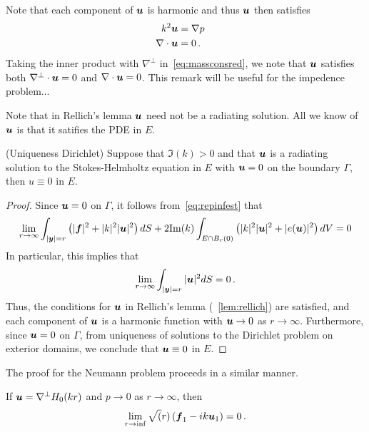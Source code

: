 \begin{remark}
Note that each component of ${\boldsymbol u}$ is harmonic and thus ${\boldsymbol u}$ then satisfies
\begin{align}
k^2 {\boldsymbol u} &= \nabla p  \quad \label{eq:massconsred} \\
\nabla \cdot {\boldsymbol u} &= 0 \, .
\end{align}
Taking the inner product with $\nabla^{\perp}$ in~\cref{eq:massconsred}, 
we note that ${\boldsymbol u}$ satisfies both $\nabla^{\perp} \cdot {\boldsymbol u} = 0$ 
and $\nabla \cdot {\boldsymbol u} = 0$.
This remark will be useful for the impedence problem...
\end{remark}
\begin{remark}
Note that in Rellich's lemma ${\boldsymbol u}$ need not be a radiating solution. 
All we know of ${\boldsymbol u}$ is that it satifies the PDE in $E$.
\end{remark}

\begin{thm}
(Uniqueness Dirichlet)
Suppose that $\Im(k)>0$ and 
that ${\boldsymbol u}$ is a radiating solution to the Stokes-Helmholtz
equation in $E$ with ${\boldsymbol u} =0$ on the boundary $\Gamma$, then
$u \equiv 0$ in $E$.
\end{thm}

\begin{proof}
Since ${\boldsymbol u} = 0$ on $\Gamma$, it follows from~\cref{eq:repinfest} that
\begin{equation}
\lim_{r\to\infty}
\int_{|{\boldsymbol y}|=r} \left( |{\boldsymbol f}|^2 + |k|^2 |{\boldsymbol u}|^2 \right) dS +
2 {\textrm{\textup{Im}}}(k) \int_{E \cap B_{r}(0)} \left(|k|^2 |{\boldsymbol u}|^2 + |e({\boldsymbol u})|^2 \right)
dV = 0
\end{equation} 
In particular, this implies that
\begin{equation}
\lim_{r\to\infty} \int_{|{\boldsymbol y}|=r} |{\boldsymbol u}|^2 dS = 0 \, .
\end{equation}
Thus, the conditions for ${\boldsymbol u}$ in Rellich's lemma (~\cref{lem:rellich})
are satisfied, and each component of ${\boldsymbol u}$ is a harmonic function
with ${\boldsymbol u} \to 0$ as $r \to \infty$. Furthermore, since ${\boldsymbol u}=0$ on
$\Gamma$, from uniqueness of solutions to the Dirichlet problem
on exterior domains, we conclude that ${\boldsymbol u} \equiv 0$ in $E$.
\end{proof}

The proof for the Neumann problem proceeds in a similar manner. 

\begin{lem}
If ${\boldsymbol u} = \nabla^{\perp} H_{0}(k r)$ and $p\to 0$ as $r\to \infty$, 
then
\begin{equation}
\lim_{r\to \inf} \sqrt(r) \left({\boldsymbol f}_{1} - ik {\boldsymbol u}_{1} \right) = 0 \, .
\end{equation}
\end{lem}


